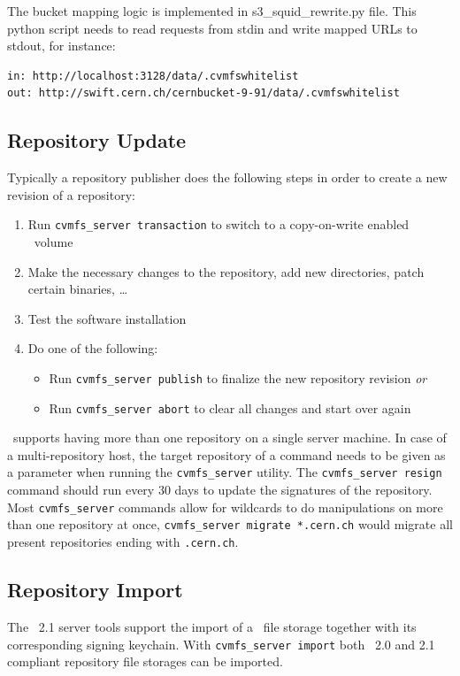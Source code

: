 The bucket mapping logic is implemented in s3\_squid\_rewrite.py file.
This python script needs to read requests from stdin and write mapped URLs to stdout, for instance:
\begin{verbatim}
in: http://localhost:3128/data/.cvmfswhitelist
out: http://swift.cern.ch/cernbucket-9-91/data/.cvmfswhitelist
\end{verbatim}

\subsection{Repository Update}
\label{sct:repoupdateprocedure}
Typically a repository publisher does the following steps in order to create a new revision of a repository:
\begin{enumerate}
	\item Run \texttt{cvmfs\_server transaction} to switch to a copy-on-write enabled \cvmfs\ volume
	\item Make the necessary changes to the repository, \eg add new directories, patch certain binaries, \dots
	\item Test the software installation
	\item Do one of the following:
	\begin{itemize}
		\item Run \texttt{cvmfs\_server publish} to finalize the new repository revision \emph{or}
		\item Run \texttt{cvmfs\_server abort} to clear all changes and start over again
	\end{itemize}
\end{enumerate}

\cvmfs\ supports having more than one repository on a single server machine.
In case of a multi-repository host, the target repository of a command needs to be given as a parameter when running the \texttt{cvmfs\_server} utility.
The \texttt{cvmfs\_server resign} command should run every 30 days to update the signatures of the repository.
Most \texttt{cvmfs\_server} commands allow for wildcards to do manipulations on more than one repository at once, \eg \texttt{cvmfs\_server migrate *.cern.ch} would migrate all present repositories ending with \texttt{.cern.ch}.

\subsection{Repository Import}
The \cvmfs\ 2.1 server tools support the import of a \cvmfs\ file storage together with its corresponding signing keychain.
With \texttt{cvmfs\_server import} both \cvmfs\ 2.0 and 2.1 compliant repository file storages can be imported.

